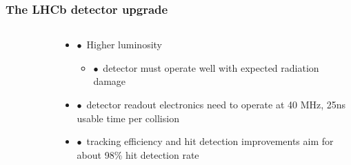 \documentclass[aspectratio=1610, 12pt]{beamer}
\begin{document}
\begin{frame}\frametitle{The LHCb detector upgrade}
  \begin{columns}
    \begin{column}[c]{0.48\textwidth}
      \begin{figure}


      \end{figure}
    \end{column}
    \begin{column}[c]{0.48\textwidth}
      \begin{itemize}
        \item $\bullet$\, Higher luminosity
        \begin{itemize}
          \item $\bullet$\, detector must operate well with expected radiation damage
        \end{itemize}
        \item $\bullet$\, detector readout electronics need to operate at 40 MHz, 25ns usable time per collision
        \item $\bullet$\, tracking efficiency and hit detection improvements aim for about 98\% hit detection rate
      \end{itemize}
    \end{column}
  \end{columns}
\end{frame}
\end{document}
